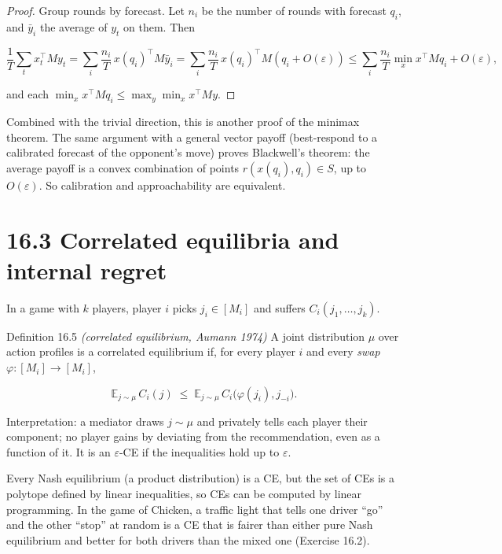 \documentclass[11pt,a4paper,openany]{book}
\newcommand{\E}{\mathbb{E}}
\newcommand{\eps}{\varepsilon}
\begin{document}
\begin{proof}
Group rounds by forecast. Let $n_i$ be the number of rounds with forecast $q_i$, and $\bar y_i$ the average of $y_t$ on them. Then

\[\frac1T\sum_tx_t^\top My_t=\sum_i\frac{n_i}{T}\,x(q_i)^\top M\bar y_i=\sum_i\frac{n_i}T\,x(q_i)^\top M(q_i+O(\eps))\le\sum_i\frac{n_i}T\min_xx^\top Mq_i+O(\eps),\]

and each $\min_xx^\top Mq_i\le\max_y\min_xx^\top My$.
\end{proof}

Combined with the trivial direction, this is another proof of the minimax theorem. The same argument with a general vector payoff (best-respond to a calibrated forecast of the opponent's move) proves Blackwell's theorem: the average payoff is a convex combination of points $r(x(q_i),q_i)\in S$, up to $O(\eps)$. So calibration and approachability are equivalent.

\section*{16.3 Correlated equilibria and internal regret}\label{ch16-ce}

In a game with $k$ players, player $i$ picks $j_i\in[M_i]$ and suffers $C_i(j_1,\dots,j_k)$.

\begin{bdef}{Definition 16.5 \emph{(correlated equilibrium, Aumann 1974)}}
A joint distribution $\mu$ over action profiles is a correlated equilibrium if, for every player $i$ and every \emph{swap} $\varphi:[M_i]\to[M_i]$,

\[\E_{j\sim\mu}\,C_i(j)\;\le\;\E_{j\sim\mu}\,C_i\big(\varphi(j_i),j_{-i}\big).\]

Interpretation: a mediator draws $j\sim\mu$ and privately tells each player their component; no player gains by deviating from the recommendation, even as a function of it. It is an $\eps$-CE if the inequalities hold up to $\eps$.
\end{bdef}

Every Nash equilibrium (a product distribution) is a CE, but the set of CEs is a polytope defined by linear inequalities, so CEs can be computed by linear programming. In the game of Chicken, a traffic light that tells one driver ``go'' and the other ``stop'' at random is a CE that is fairer than either pure Nash equilibrium and better for both drivers than the mixed one (Exercise 16.2).
\end{document}
